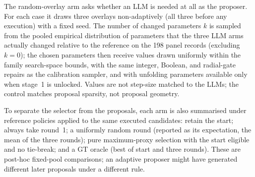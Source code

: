 \documentclass[a4paper,fleqn]{cas-dc}
\begin{document}
The random-overlay arm asks whether an LLM is needed at all as the proposer. For each case it draws three overlays non-adaptively (all three before any execution) with a fixed seed. The number of changed parameters $k$ is sampled from the pooled empirical distribution of parameters that the three LLM arms actually changed relative to the reference on the 198 panel records (excluding $k=0$); the chosen parameters then receive values drawn uniformly within the family search-space bounds, with the same integer, Boolean, and radial-gate repairs as the calibration sampler, and with unfolding parameters available only when stage~1 is unlocked. Values are not step-size matched to the LLMs; the control matches proposal sparsity, not proposal geometry.

To separate the selector from the proposals, each arm is also summarised under reference policies applied to the same executed candidates: retain the start; always take round~1; a uniformly random round (reported as its expectation, the mean of the three rounds); pure maximum-proxy selection with the start eligible and no tie-break; and a GT oracle (best of start and three rounds). These are post-hoc fixed-pool comparisons; an adaptive proposer might have generated different later proposals under a different rule.
\end{document}
